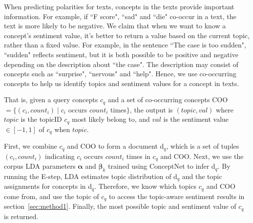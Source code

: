 When predicting polarities for texts, concepts in the texts provide important information. For example, if ``F score", ``sad" and ``die" co-occur in a text, the text is more likely to be negative. We claim that when we want to know a concept's sentiment value, it's better to return a value based on the current topic, rather than a fixed value. For example, in the sentence ``The case is too sudden", ``sudden" reflects sentiment, but it is both possible to be positive and negative depending on the description about ``the case". The description may consist of concepts such as ``surprise", ``nervous" and ``help". Hence, we use co-occurring concepts to help us identify topics and sentiment values for a concept in texts.

That is, given a query concepts $c_q$ and a set of co-occurring concepts COO $= \{(c_i, count_i) \mid c_i$ occurs $count_i$ times$\}$, the output is $(topic, val)$ where $topic$ is the topicID $c_q$ most likely belong to, and $val$ is the sentiment value $\in [-1, 1]$ of $c_q$ when $topic$.

First, we combine $c_q$ and COO to form a document d$_q$, which is a set of tuples $(c_i, count_i)$ indicating $c_i$ occurs $count_i$ times in $c_q$ and COO. Next, we use the corpus LDA parameters $\boldsymbol{\alpha}$ and $\boldsymbol{\beta}_k$ trained using ConceptNet to infer d$_q$. By running the E-step, LDA estimates topic distribution of d$_q$ and the topic assignments for concepts in d$_q$. Therefore, we know which topics $c_q$ and COO come from, and use the topic of $c_q$ to access the topic-aware sentiment results in section~\ref{sec:method1}. Finally, the most possible topic and sentiment value of $c_q$ is returned.



